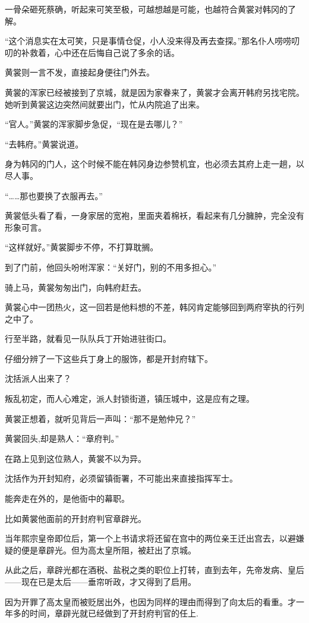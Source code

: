 一骨朵砸死蔡确，听起来可笑至极，可越想越是可能，也越符合黄裳对韩冈的了解。

“这个消息实在太可笑，只是事情仓促，小人没来得及再去查探。”那名仆人唠唠叨叨的补救着，心中还在后悔自己说了多余的话。

黄裳则一言不发，直接起身便往门外去。

黄裳的浑家已经被接到了京城，就是因为家眷来了，黄裳才会离开韩府另找宅院。她听到黄裳这边突然间就要出门，忙从内院追了出来。

“官人。”黄裳的浑家脚步急促，“现在是去哪儿？”

“去韩府。”黄裳说道。

身为韩冈的门人，这个时候不能在韩冈身边参赞机宜，也必须去其府上走一趟，以尽人事。

“……那也要换了衣服再去。”

黄裳低头看了看，一身家居的宽袍，里面夹着棉袄，看起来有几分臃肿，完全没有形象可言。

“这样就好。”黄裳脚步不停，不打算耽搁。

到了门前，他回头吩咐浑家：“关好门，别的不用多担心。”

骑上马，黄裳匆匆出门，向韩府赶去。

黄裳心中一团热火，这一回若是他料想的不差，韩冈肯定能够回到两府宰执的行列之中了。

行至半路，就看见一队队兵丁开始进驻街口。

仔细分辨了一下这些兵丁身上的服饰，都是开封府辖下。

沈括派人出来了？

叛乱初定，而人心难定，派人封锁街道，镇压城中，这是应有之理。

黄裳正想着，就听见背后一声叫：“那不是勉仲兄？”

黄裳回头,却是熟人：“章府判。”

在路上见到这位熟人，黄裳不以为异。

沈括作为开封知府，必须留镇衙署，不可能出来直接指挥军士。

能奔走在外的，是他衙中的幕职。

比如黄裳他面前的开封府判官章辟光。

当年熙宗皇帝即位后，第一个上书请求将还留在宫中的两位亲王迁出宫去，以避嫌疑的便是章辟光。但为高太皇所阻，被赶出了京城。

从此之后，章辟光都在酒税、盐税之类的职位上打转，直到去年，先帝发病、皇后——现在已是太后——垂帘听政，才又得到了启用。

因为开罪了高太皇而被贬居出外，也因为同样的理由而得到了向太后的看重。才一年多的时间，章辟光就已经做到了开封府判官的任上.

